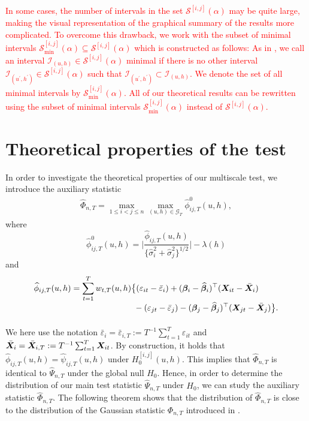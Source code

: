 \documentclass[a4paper,12pt]{article}
\makeatletter
\renewcommand{\eqref}[1]{\tagform@{\ref{#1}}}
\makeatother
\begin{document}
\textcolor{red}{In some cases, the number of intervals in the set $\mathcal{S}^{[i, j]}(\alpha)$ may be quite large, making the visual representation of the graphical summary of the results more complicated. To overcome this drawback, we work with the subset of minimal intervals $\mathcal{S}^{[i, j]}_{\text{min}}(\alpha) \subseteq \mathcal{S}^{[i, j]}(\alpha)$ which is constructed as follows: As in \cite{Duembgen2002}, we call an interval $\mathcal{I}_{(u, h)} \in \mathcal{S}^{[i, j]}(\alpha)$ minimal if there is no other interval $\mathcal{I}_{(u^\prime, h^\prime)} \in \mathcal{S}^{[i, j]}(\alpha)$ such that $\mathcal{I}_{(u^\prime, h^\prime)} \subset \mathcal{I}_{(u, h)}$. We denote the set of all minimal intervals by $\mathcal{S}^{[i, j]}_{\text{min}}(\alpha)$. All of our theoretical results can be rewritten using the subset of minimal intervals $\mathcal{S}^{[i, j]}_{\text{min}}(\alpha)$ instead of $\mathcal{S}^{[i, j]}(\alpha)$.}


\section{Theoretical properties of the test}\label{sec:theo}


In order to investigate the theoretical properties of our multiscale test, we introduce the auxiliary statistic
\begin{align}\label{eq:Phi_hat}
\widehat{\Phi}_{n,T} = \max_{1 \le i < j \le n}  \max_{(u, h) \in \mathcal{G}_T} \widehat{\phi}^0_{ij, T}(u, h),
\end{align}
where
\begin{equation*}%
\widehat{\phi}^0_{ij, T}(u, h) =\bigg| \frac{\widehat{\phi}_{ij, T}(u, h)} {\{ \widehat{\sigma}_i^2 + \widehat{\sigma}_j^2 \}^{1/2}} \bigg| - \lambda(h)
\end{equation*}
and
\begin{align*}
\widehat{\phi}_{ij, T}(u, h) 
 & = \sum_{t=1}^T w_{t,T}(u, h) \big\{ (\varepsilon_{it} - \bar{\varepsilon}_i) + (\bfbeta_i - \widehat{\bfbeta}_i)^\top (\X_{it} - \bar{\X}_{i}) \\[-0.4cm]
 & \phantom{= \sum_{t=1}^T w_{t,T}(u, h) \big\{} - (\varepsilon_{jt} - \bar{\varepsilon}_j) -  (\bfbeta_j - \widehat{\bfbeta}_j)^\top (\X_{jt} - \bar{\X}_{j}) \big\}.
\end{align*}
We here use the notation $\bar{\varepsilon}_i = \bar{\varepsilon}_{i,T} := T^{-1} \sum_{t=1}^T \varepsilon_{it}$ and $\bar{\boldsymbol{X}}_{i} =  \bar{\boldsymbol{X}}_{i, T} := T^{-1}\sum_{t=1}^T  \boldsymbol{X}_{it}$. By construction, it holds that $\widehat{\phi}_{ij, T}(u, h) = \widehat{\psi}_{ij, T}(u, h)$ under $H_0^{[i, j]}(u, h)$. This implies that $\widehat{\Phi}_{n,T}$ is identical to $\widehat{\Psi}_{n,T}$ under the global null $H_0$. Hence, in order to determine the distribution of our main test statistic $\widehat{\Psi}_{n,T}$ under $H_0$, we can study the auxiliary statistic $\widehat{\Phi}_{n,T}$. The following theorem shows that the distribution of $\widehat{\Phi}_{n,T}$ is close to the distribution of the Gaussian statistic $\Phi_{n,T}$ introduced in \eqref{eq:Phi}. 
\end{document}
